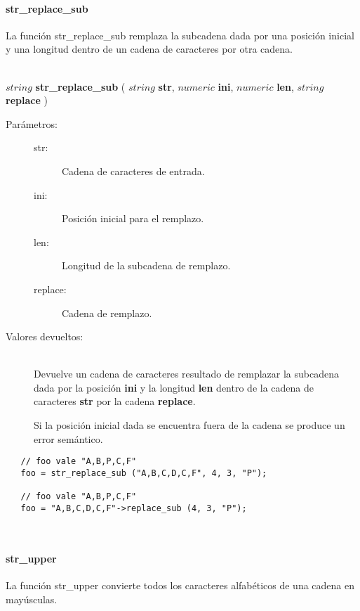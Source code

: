 \paragraph{str\_replace\_sub}
La función str\_replace\_sub remplaza la subcadena dada por una posición inicial y una longitud dentro de un cadena de caracteres por otra cadena.

\hfill \\ $string$ \textbf{str\_replace\_sub} ( $string$ \textbf{str}, $numeric$ \textbf{ini}, $numeric$ \textbf{len}, $string$ \textbf{replace} )  
\begin{description}
\item [Parámetros:] \hfill 
   \begin{description}
   \item[str:] Cadena de caracteres de entrada.
   \item[ini:] Posición inicial para el remplazo.
   \item[len:] Longitud de la subcadena de remplazo.
   \item[replace:] Cadena de remplazo.
   \end{description}
\item[Valores devueltos:] \hfill \\
   Devuelve un cadena de caracteres resultado de remplazar la subcadena dada por la posición \textbf{ini} y la longitud
   \textbf{len} dentro de la cadena de caracteres \textbf{str} por la cadena \textbf{replace}.
   
   Si la posición inicial dada se encuentra fuera de la cadena se produce un error semántico.
\end{description}

\begin{lstlisting}
   // foo vale "A,B,P,C,F" 
   foo = str_replace_sub ("A,B,C,D,C,F", 4, 3, "P"); 
   
   // foo vale "A,B,P,C,F" 
   foo = "A,B,C,D,C,F"->replace_sub (4, 3, "P");
\end{lstlisting}
\hfill\\ 

\paragraph{str\_upper}
La función str\_upper convierte todos los caracteres alfabéticos de una cadena en mayúsculas. 

